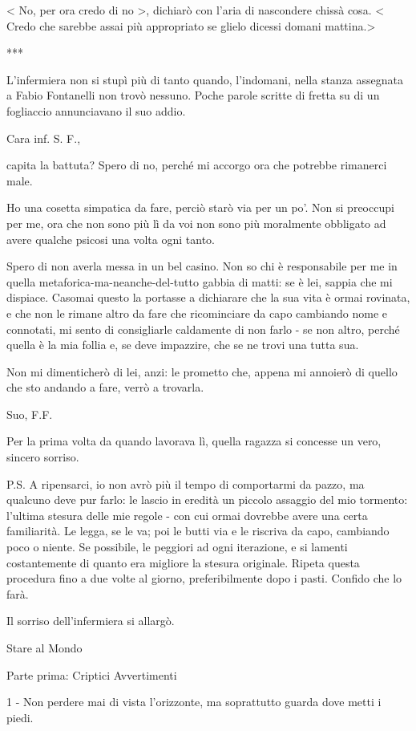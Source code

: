 < No, per ora credo di no >, dichiarò con l'aria di nascondere chissà cosa. < Credo che sarebbe assai più appropriato se glielo dicessi domani mattina.>

***

L'infermiera non si stupì più di tanto quando, l'indomani, nella stanza assegnata a Fabio Fontanelli non trovò nessuno. Poche parole scritte di fretta su di un fogliaccio annunciavano il suo addio.

Cara inf. S. F.,

capita la battuta? Spero di no, perché mi accorgo ora che potrebbe rimanerci male.

Ho una cosetta simpatica da fare, perciò starò via per un po'. Non si preoccupi per me, ora che non sono più lì da voi non sono più moralmente obbligato ad avere qualche psicosi una volta ogni tanto.

Spero di non averla messa in un bel casino. Non so chi è responsabile per me in quella metaforica-ma-neanche-del-tutto gabbia di matti: se è lei, sappia che mi dispiace. Casomai questo la portasse a dichiarare che la sua vita è ormai rovinata, e che non le rimane altro da fare che ricominciare da capo cambiando nome e connotati, mi sento di consigliarle caldamente di non farlo - se non altro, perché quella è la mia follia e, se deve impazzire, che se ne trovi una tutta sua.

Non mi dimenticherò di lei, anzi: le prometto che, appena mi annoierò di quello che sto andando a fare, verrò a trovarla.

Suo,
F.F.

Per la prima volta da quando lavorava lì, quella ragazza si concesse un vero, sincero sorriso.

P.S. A ripensarci, io non avrò più il tempo di comportarmi da pazzo, ma qualcuno deve pur farlo: le lascio in eredità un piccolo assaggio del mio tormento: l'ultima stesura delle mie regole - con cui ormai dovrebbe avere una certa familiarità. Le legga, se le va; poi le butti via e le riscriva da capo, cambiando poco o niente. Se possibile, le peggiori ad ogni iterazione, e si lamenti costantemente di quanto era migliore la stesura originale. Ripeta questa procedura fino a due volte al giorno, preferibilmente dopo i pasti. Confido che lo farà.

Il sorriso dell'infermiera si allargò.

Stare al Mondo

Parte prima: Criptici Avvertimenti

1 - Non perdere mai di vista l’orizzonte, ma soprattutto guarda dove metti i piedi.

